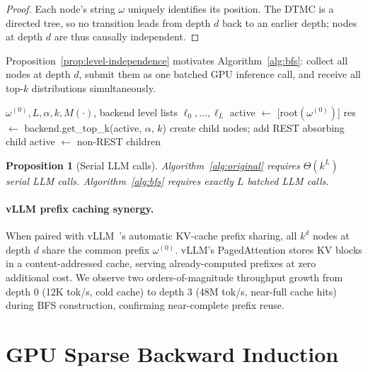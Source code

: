 \documentclass{article}
\newtheorem{proposition}[theorem]{Proposition}
\begin{document}
\begin{proof}
Each node's string $\omega$ uniquely identifies its position.
The DTMC is a directed tree, so no transition leads from depth $d$ back to an
earlier depth; nodes at depth $d$ are thus causally independent.
\end{proof}

Proposition~\ref{prop:level-independence} motivates Algorithm~\ref{alg:bfs}:
collect all nodes at depth $d$, submit them as one batched GPU inference call,
and receive all top-$k$ distributions simultaneously.

\begin{algorithm}[tb]
\caption{BFS DTMC construction with batched GPU inference}
\label{alg:bfs}
\begin{algorithmic}[1]
\Require $\omega^{(0)}, L, \alpha, k, M(\cdot)$, backend
\Ensure level lists $\ell_0, \ldots, \ell_L$
\State active $\gets$ [root$(\omega^{(0)})$]
  \State res $\gets$ backend.get\_top\_k(active, $\alpha$, $k$) \label{line:batch}
    \State create child nodes; add REST absorbing child
  \EndFor
  \State active $\gets$ non-REST children
\EndFor
\end{algorithmic}
\end{algorithm}

\begin{proposition}[Serial LLM calls]
Algorithm~\ref{alg:original} requires $\Theta(k^L)$ serial LLM calls.
Algorithm~\ref{alg:bfs} requires exactly $L$ batched LLM calls.
\end{proposition}

\paragraph{vLLM prefix caching synergy.}
When paired with vLLM~\citep{kwon2023efficient}'s automatic KV-cache prefix
sharing, all $k^d$ nodes at depth $d$ share the common prefix $\omega^{(0)}$.
vLLM's PagedAttention stores KV blocks in a content-addressed cache, serving
already-computed prefixes at zero additional cost.
We observe two orders-of-magnitude throughput growth from depth 0 (12K tok/s,
cold cache) to depth 3 (48M tok/s, near-full cache hits) during BFS
construction, confirming near-complete prefix reuse.

\section{GPU Sparse Backward Induction}
\label{sec:backward}
\end{document}
